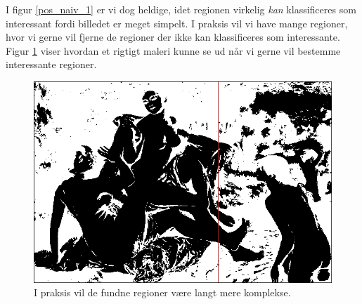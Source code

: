 {I figur \ref{pos_naiv_1} er vi dog heldige, idet regionen virkelig
\emph{kan} klassificeres som interessant fordi billedet er meget simpelt. I
praksis vil vi have mange regioner, hvor vi gerne vil fjerne de regioner
der ikke kan klassificeres som interessante. Figur
\ref{realworld_example} viser hvordan et rigtigt maleri kunne se ud når
vi gerne vil bestemme interessante regioner.
\begin{figure}[p]
	\begin{center}
		\includegraphics[scale=0.42,angle=0]{afsnit/vores_implementation/billeder/naiv_algoritme/bathers_mockup_blob}
	\end{center}
	\caption[Interessante regioner i praksis]{I praksis vil de
	fundne regioner være langt mere komplekse.}
	\label{realworld_example}
\end{figure}

}
